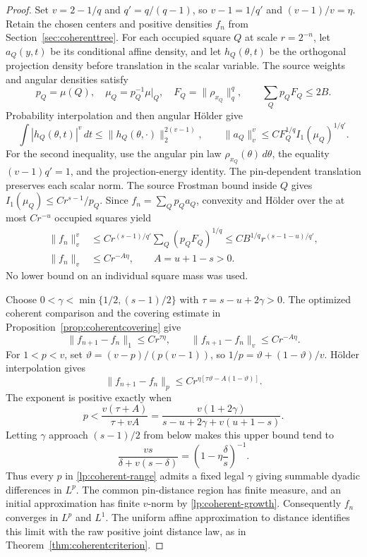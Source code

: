 \begin{proof}
Set \(v=2-1/q\) and \(q'=q/(q-1)\), so
\(v-1=1/q'\) and \((v-1)/v=\eta\). Retain the chosen centers and
positive densities \(f_n\) from Section~\ref{sec:coherenttree}. For each
occupied square \(Q\) at scale \(r=2^{-n}\), let \(a_Q(y,t)\) be
its conditional affine density, and let \(h_Q(\theta,t)\) be the
orthogonal projection density before translation in the scalar variable.
The source weights and angular densities satisfy
\[
 p_Q=\mu(Q),\quad \mu_Q=p_Q^{-1}\mu|_Q,\quad
 F_Q=\|\rho_{x_Q}\|_q^q,\qquad \sum_Qp_QF_Q\le2B.
\]
Probability interpolation and then angular H\"older give
\[
 \int |h_Q(\theta,t)|^v\,dt
 \le\|h_Q(\theta,\cdot)\|_2^{2(v-1)},\qquad
 \|a_Q\|_v^v\le C F_Q^{1/q}I_1(\mu_Q)^{1/q'}.
\]
For the second inequality, use the angular pin law
\(\rho_{x_Q}(\theta)\,d\theta\), the equality \((v-1)q'=1\),
and the projection-energy identity. The pin-dependent translation preserves
each scalar norm. The source Frostman bound inside \(Q\) gives
\(I_1(\mu_Q)\le Cr^{s-1}/p_Q\).
Since \(f_n=\sum_Qp_Qa_Q\), convexity and H\"older over the
at most \(Cr^{-u}\) occupied squares yield
\begin{align}
 \|f_n\|_v^v
 &\le C r^{(s-1)/q'}\sum_Q(p_QF_Q)^{1/q}
 \le C B^{1/q}r^{(s-1-u)/q'},\label{lp:coherent-growth}\\
 \|f_n\|_v&\le C r^{-A\eta},\qquad A=u+1-s>0.\nonumber
\end{align}
No lower bound on an individual square mass was used.

Choose \(0<\gamma<\min\{1/2,(s-1)/2\}\) with
\(\tau=s-u+2\gamma>0\). The optimized coherent comparison and
the covering estimate in Proposition~\ref{prop:coherentcovering} give
\[
 \|f_{n+1}-f_n\|_1\le C r^{\tau\eta},\qquad
 \|f_{n+1}-f_n\|_v\le C r^{-A\eta}.
\]
For \(1<p<v\), set
\(\vartheta=(v-p)/(p(v-1))\), so
\(1/p=\vartheta+(1-\vartheta)/v\). H\"older interpolation gives
\[
 \|f_{n+1}-f_n\|_p
 \le C r^{\eta[\tau\vartheta-A(1-\vartheta)]}.
\]
The exponent is positive exactly when
\[
 p<\frac{v(\tau+A)}{\tau+vA}
 =\frac{v(1+2\gamma)}{s-u+2\gamma+v(u+1-s)}.
\]
Letting \(\gamma\) approach \((s-1)/2\) from below makes this upper
bound tend to
\[
 \frac{vs}{\delta+v(s-\delta)}
 =\left(1-\eta\frac\delta s\right)^{-1}.
\]
Thus every \(p\) in \eqref{lp:coherent-range} admits a fixed legal
\(\gamma\) giving summable dyadic differences in \(L^p\).
The common pin-distance region has finite measure, and an initial
approximation has finite \(v\)-norm by \eqref{lp:coherent-growth}.
Consequently \(f_n\) converges in \(L^p\) and \(L^1\).
The uniform affine approximation to distance identifies this limit with
the raw positive joint distance law, as in Theorem~\ref{thm:coherentcriterion}.
\end{proof}

